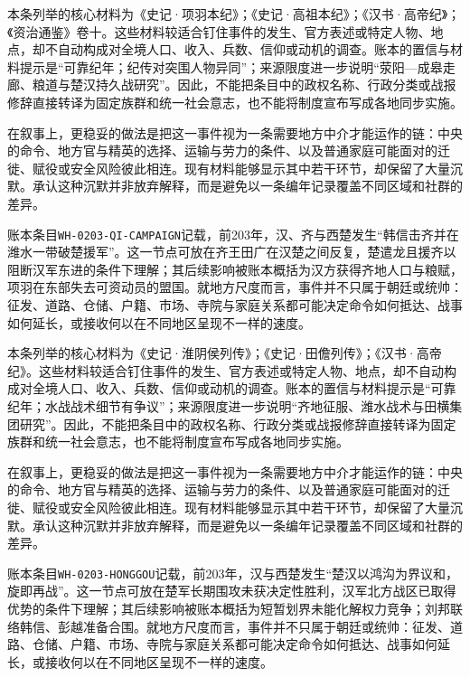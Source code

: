 本条列举的核心材料为《史记·项羽本纪》；《史记·高祖本纪》；《汉书·高帝纪》；《资治通鉴》卷十。这些材料较适合钉住事件的发生、官方表述或特定人物、地点，却不自动构成对全境人口、收入、兵数、信仰或动机的调查。账本的置信与材料提示是“可靠纪年；纪传对突围人物异同”；来源限度进一步说明“荥阳—成皋走廊、粮道与楚汉持久战研究”。因此，不能把条目中的政权名称、行政分类或战报修辞直接转译为固定族群和统一社会意志，也不能将制度宣布写成各地同步实施。

在叙事上，更稳妥的做法是把这一事件视为一条需要地方中介才能运作的链：中央的命令、地方官与精英的选择、运输与劳力的条件、以及普通家庭可能面对的迁徙、赋役或安全风险彼此相连。现有材料能够显示其中若干环节，却保留了大量沉默。承认这种沉默并非放弃解释，而是避免以一条编年记录覆盖不同区域和社群的差异。

账本条目\texttt{WH-0203-QI-CAMPAIGN}记载，前203年，汉、齐与西楚发生“韩信击齐并在潍水一带破楚援军”。这一节点可放在齐王田广在汉楚之间反复，楚遣龙且援齐以阻断汉军东进的条件下理解；其后续影响被账本概括为汉方获得齐地人口与粮赋，项羽在东部失去可资动员的盟国。就地方尺度而言，事件并不只属于朝廷或统帅：征发、道路、仓储、户籍、市场、寺院与家庭关系都可能决定命令如何抵达、战事如何延长，或接收何以在不同地区呈现不一样的速度。

本条列举的核心材料为《史记·淮阴侯列传》；《史记·田儋列传》；《汉书·高帝纪》。这些材料较适合钉住事件的发生、官方表述或特定人物、地点，却不自动构成对全境人口、收入、兵数、信仰或动机的调查。账本的置信与材料提示是“可靠纪年；水战战术细节有争议”；来源限度进一步说明“齐地征服、潍水战术与田横集团研究”。因此，不能把条目中的政权名称、行政分类或战报修辞直接转译为固定族群和统一社会意志，也不能将制度宣布写成各地同步实施。

在叙事上，更稳妥的做法是把这一事件视为一条需要地方中介才能运作的链：中央的命令、地方官与精英的选择、运输与劳力的条件、以及普通家庭可能面对的迁徙、赋役或安全风险彼此相连。现有材料能够显示其中若干环节，却保留了大量沉默。承认这种沉默并非放弃解释，而是避免以一条编年记录覆盖不同区域和社群的差异。

账本条目\texttt{WH-0203-HONGGOU}记载，前203年，汉与西楚发生“楚汉以鸿沟为界议和，旋即再战”。这一节点可放在楚军长期围攻未获决定性胜利，汉军北方战区已取得优势的条件下理解；其后续影响被账本概括为短暂划界未能化解权力竞争；刘邦联络韩信、彭越准备合围。就地方尺度而言，事件并不只属于朝廷或统帅：征发、道路、仓储、户籍、市场、寺院与家庭关系都可能决定命令如何抵达、战事如何延长，或接收何以在不同地区呈现不一样的速度。

